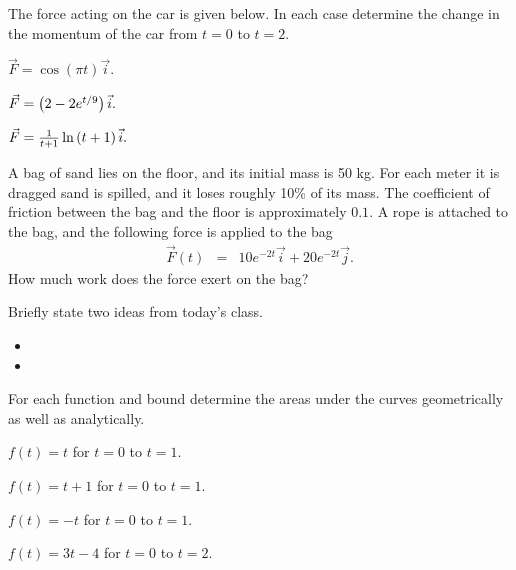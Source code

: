 \begin{problem}
\item The force acting on the car is given below. In each case
  determine the change in the momentum of the car from $t=0$ to $t=2$.
  \begin{subproblem}
    \item $\vec{F} = \cos(\pi t) \vec{i}.$
      \vfill
    \item $\vec{F} = \left( 2 - 2 e^{t/9} \right) \vec{i}.$
      \vfill
    \item $\vec{F} = \frac{1}{t+1} \ln\left( t+1 \right) \vec{i}.$
      \vfill
  \end{subproblem}

  \clearpage

\item A bag of sand lies on the floor, and its initial mass is 50
  kg. For each meter it is dragged sand is spilled, and it loses
  roughly 10\% of its mass. The coefficient of friction between the
  bag and the floor is approximately $0.1$. A rope is attached to the
  bag, and the following force is applied to the bag
  \begin{eqnarray*}
    \vec{F}(t) & = & 10e^{-2t} \vec{i} + 20 e^{-2t} \vec{j}.
  \end{eqnarray*}
  How much work does the force exert on the bag?

  \vfill

\end{problem}

\postClass

\begin{problem}
\item Briefly state two ideas from today's class.
  \begin{itemize}
  \item 
  \item 
  \end{itemize}
\item 
  \begin{subproblem}
    \item
  \end{subproblem}
\end{problem}


\begin{problem}
\item For each function and bound determine the areas under the curves
  geometrically as well as analytically.
  \begin{subproblem}
  \item $f(t)=t$ for $t=0$ to $t=1$.
    \vfill
  \item $f(t)=t+1$ for $t=0$ to $t=1$.
    \vfill
  \item $f(t)=-t$ for $t=0$ to $t=1$.
    \vfill
  \item $f(t)=3t-4$ for $t=0$ to $t=2$.
    \vfill
  \end{subproblem}
\end{problem}


